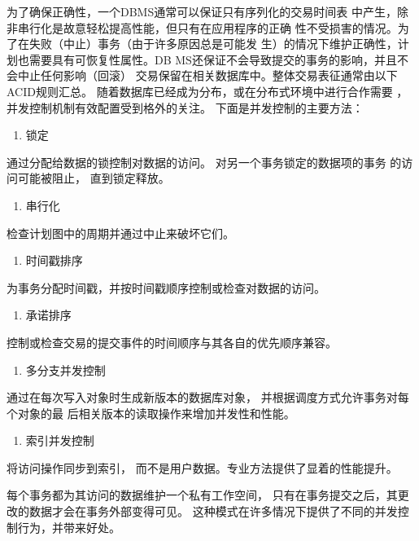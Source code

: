 为了确保正确性，一个DBMS通常可以保证只有序列化的交易时间表
中产生，除非串行化是故意轻松提高性能，但只有在应用程序的正确
性不受损害的情况。为了在失败（中止）事务（由于许多原因总是可能发
生）的情况下维护正确性，计划也需要具有可恢复性属性。DB
MS还保证不会导致提交的事务的影响，并且不会中止任何影响（回滚）
交易保留在相关数据库中。整体交易表征通常由以下ACID规则汇总。
随着数据库已经成为分布，或在分布式环境中进行合作需要
，并发控制机制有效配置受到格外的关注。
下面是并发控制的主要方法：

	\begin{enumerate}[resume]
		\item 锁定
	\end{enumerate}

	通过分配给数据的锁控制对数据的访问。
	对另一个事务锁定的数据项的事务
	的访问可能被阻止，
	直到锁定释放。
	
	\begin{enumerate}[resume]
		\item 串行化
	\end{enumerate}

 检查计划图中的周期并通过中止来破坏它们。
 \begin{enumerate}[resume]
 	\item 时间戳排序
 \end{enumerate}

   为事务分配时间戳，并按时间戳顺序控制或检查对数据的访问。
   
    \begin{enumerate}[resume]
   	\item 承诺排序
   \end{enumerate}

 控制或检查交易的提交事件的时间顺序与其各自的优先顺序兼容。
 
\begin{enumerate}[resume]
	\item 多分支并发控制
\end{enumerate}

通过在每次写入对象时生成新版本的数据库对象，
	并根据调度方式允许事务对每个对象的最
	后相关版本的读取操作来增加并发性和性能。
	
	\begin{enumerate}[resume]
		\item 索引并发控制
	\end{enumerate}

将访问操作同步到索引，
而不是用户数据。专业方法提供了显着的性能提升。

每个事务都为其访问的数据维护一个私有工作空间，
只有在事务提交之后，其更改的数据才会在事务外部变得可见。
这种模式在许多情况下提供了不同的并发控制行为，并带来好处。
